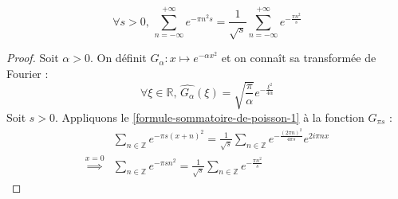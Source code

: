 	\begin{application}
		\[ \forall s > 0, \, \sum_{n=-\infty}^{+\infty} e^{-\pi n^2 s} = \frac{1}{\sqrt{s}} \sum_{n=-\infty}^{+\infty} e^{-\frac{\pi n^2}{s}} \]
	\end{application}

	\begin{proof}
		Soit $\alpha > 0$. On définit $G_\alpha : x \mapsto e^{-\alpha x^2}$ et on connaît sa transformée de Fourier :
		\[ \forall \xi \in \mathbb{R}, \, \widehat{G_\alpha}(\xi) = \sqrt{\frac{\pi}{\alpha}} e^{-\frac{\xi^2}{4 \alpha}} \]
		Soit $s > 0$. Appliquons le \cref{formule-sommatoire-de-poisson-1} à la fonction $G_{\pi s}$ :
		\begin{align*}
			& \sum_{n \in \mathbb{Z}} e^{-\pi s (x + n)^2} = \frac{1}{\sqrt{s}} \sum_{n \in \mathbb{Z}} e^{-\frac{(2 \pi n)^2}{4 \pi s}} e^{2 i \pi n x} \\
			\overset{x = 0}{\implies} & \sum_{n \in \mathbb{Z}} e^{-\pi s n^2} = \frac{1}{\sqrt{s}} \sum_{n \in \mathbb{Z}} e^{-\frac{\pi n^2}{s}}
		\end{align*}
	\end{proof}

